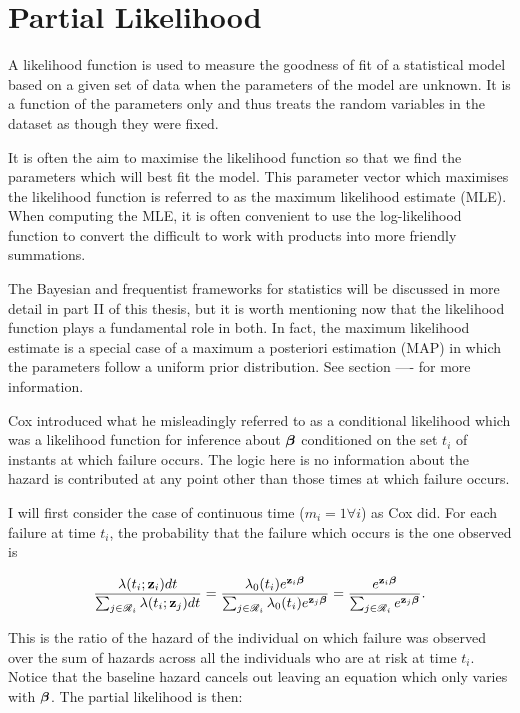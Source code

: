 \newpage
\section{Partial Likelihood}\label{partial-likelihood}

A likelihood function is used to measure the goodness of fit of a statistical model based on a given set of data when the parameters of the model are unknown. It is a function of the parameters only and thus treats the random variables in the dataset as though they were fixed.

It is often the aim to maximise the likelihood function so that we find the parameters which will best fit the model. This parameter vector which maximises the likelihood function is referred to as the maximum likelihood estimate (MLE). When computing the MLE, it is often convenient to use the log-likelihood function to convert the difficult to work with products into more friendly summations.

The Bayesian and frequentist frameworks for statistics will be discussed in more detail in part II of this thesis, but it is worth mentioning now that the likelihood function plays a fundamental role in both. In fact, the maximum likelihood estimate is a special case of a maximum a posteriori estimation (MAP) in which the parameters follow a uniform prior distribution. See section ---- for more information.

Cox  introduced what he misleadingly referred to as a conditional likelihood which was a likelihood function for inference about $\boldsymbol{\beta}$ conditioned on the set ${t_i}$ of instants at which failure occurs. The logic here is no information about the hazard is contributed at any point other than those times at which failure occurs. 

I will first consider the case of continuous time ($m_i=1\forall i$) as Cox  did. For each failure at time $t_i$, the probability that the failure which occurs is the one observed is 

\begin{equation}
    \frac{\lambda(t_i; \textbf{z}_i)dt}{\sum_{j\in\mathscr{R}_i}\lambda(t_i; \textbf{z}_{j})dt} = 
    \frac{\lambda_0(t_i)e^{\textbf{z}_i\boldsymbol{\beta}}}{\sum_{j\in\mathscr{R}_i}\lambda_0(t_i)e^{\textbf{z}_j\boldsymbol{\beta}}} = \frac{e^{\textbf{z}_i\boldsymbol{\beta}}}{\sum_{j\in\mathscr{R}_i}e^{\textbf{z}_j\boldsymbol{\beta}}}.
\end{equation}

This is the ratio of the hazard of the individual on which failure was observed over the sum of hazards across all the individuals who are at risk at time $t_i$. Notice that the baseline hazard cancels out leaving an equation which only varies with $\boldsymbol{\beta}$. The partial likelihood is then:


